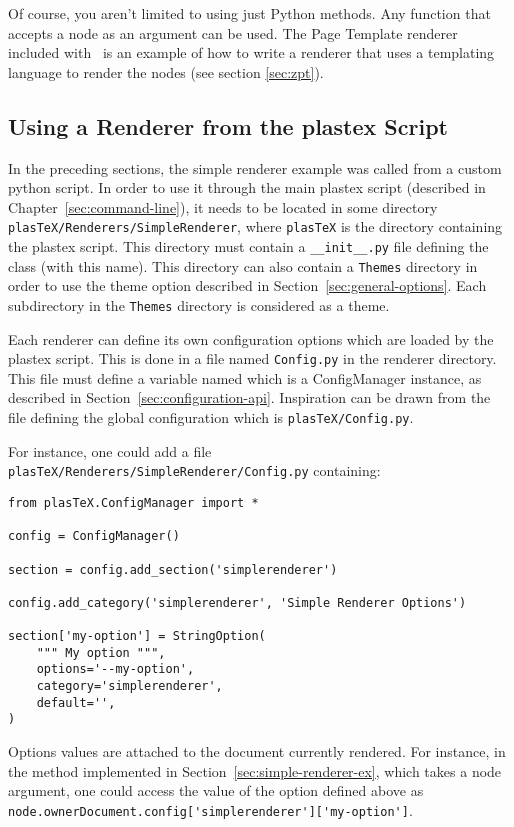 Of course, you aren't limited to using just Python methods.  Any function
that accepts a node as an argument can be used.  The
Page Template renderer included with \plasTeX\ is an example
of how to write a renderer that uses a templating language to render
the nodes (see section \ref{sec:zpt}).

\subsection{Using a Renderer from the plastex Script}
\label{subsec:renderer-from-script}

In the preceding sections, the simple renderer example was called from
a custom python script. In order to use it through the
main plastex script (described in Chapter~\ref{sec:command-line}), it
needs to be located in some directory
\verb+plasTeX/Renderers/SimpleRenderer+, where \verb+plasTeX+ is the
directory containing the plastex script. This directory must contain a
\verb+__init__.py+ file defining the  class (with this
name). This directory can also contain a \verb+Themes+ directory in
order to use the theme option described in
Section~\ref{sec:general-options}. Each subdirectory in the
\verb+Themes+ directory is considered as a theme.

Each renderer can define its own configuration options which are loaded
by the plastex script. This is done in a file named \verb+Config.py+
in the renderer directory. This file must define a variable named
 which is a ConfigManager instance, as described in
Section~\ref{sec:configuration-api}. Inspiration can be drawn from the
file defining the global configuration which is
\verb+plasTeX/Config.py+.

For instance, one could add a file
\verb+plasTeX/Renderers/SimpleRenderer/Config.py+ containing:

\begin{verbatim}
from plasTeX.ConfigManager import *

config = ConfigManager()

section = config.add_section('simplerenderer')

config.add_category('simplerenderer', 'Simple Renderer Options')

section['my-option'] = StringOption(
    """ My option """,
    options='--my-option',
    category='simplerenderer',
    default='',
)
\end{verbatim}

Options values are attached to the document currently rendered. For
instance, in the  method implemented in
Section~\ref{sec:simple-renderer-ex}, which takes a node argument, one
could access the value of the option defined above as
\verb+node.ownerDocument.config['simplerenderer']['my-option']+.


